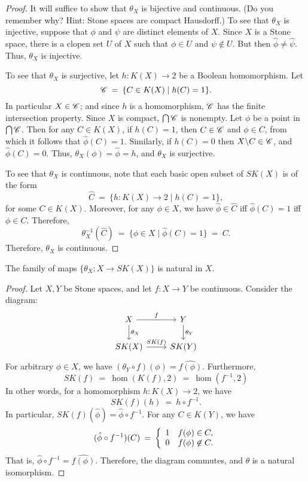 \begin{proof} It will suffice to show that $\theta _X$ is bijective
  and continuous.  (Do you remember why?  Hint: Stone spaces are
  compact Hausdorff.)  To see that $\theta _X$ is injective, suppose
  that $\phi$ and $\psi$ are distinct elements of $X$.  Since $X$ is a
  Stone space, there is a clopen set $U$ of $X$ such that $\phi\in U$
  and $\psi\not\in U$.  But then $\hat{\phi}\neq \hat{\psi}$.  Thus,
  $\theta _X$ is injective.

To see that $\theta _X$ is surjective, let $h:K(X)\to 2$ be a Boolean
homomorphism.  Let
\[ \mathscr C \: = \: \{ C\in K(X) \mid h(C) = 1 \} .\] In particular $X\in
\mathscr C$; and since $h$ is a homomorphism, $\mathscr C$ has the finite
intersection property.  Since $X$ is compact, $\bigcap \mathscr C$ is
nonempty.  Let $\phi$ be a point in $\bigcap\mathscr C$.  Then for any $C\in
K(X)$, if $h(C)=1$, then $C\in \mathscr C$ and $\phi \in C$, from which it
follows that $\hat{\phi}(C)=1$.  Similarly, if $h(C)=0$ then
$X\backslash C\in \mathscr C$, and $\hat{\phi }(C)=0$.  Thus, $\theta _X(\phi
)=\hat{\phi}=h$, and $\theta _X$ is surjective.

To see that $\theta _X$ is continuous, note that each basic open
subset of $SK(X)$ is of the form 
\[ \hat{C} \: = \: \{ h:K(X)\to 2 \mid h(C)=1 \} ,\] for some $C\in
K(X)$.  Moreover, for any $\phi \in X$, we have $\hat{\phi}\in
\hat{C}$ iff $\hat{\phi}(C)=1$ iff $\phi\in C$.  Therefore,
\[ \theta _X^{-1}(\hat{C}) \: = \: \{ \phi\in X \mid \hat{\phi}(C)=1
\} \: = \: C .\] Therefore, $\theta _X$ is continuous. \end{proof}

\begin{lemma} The family of maps $\{ \theta _X:X\to SK(X) \}$ is
  natural in $X$. \end{lemma}

\begin{proof} Let $X,Y$ be Stone spaces, and let $f:X\to Y$ be
  continuous.  Consider the diagram:
\[ \begin{tikzcd}
  X \arrow{r}{f} \arrow{d}{\theta _X} & Y \arrow{d}{\theta _Y} \\
  SK(X) \arrow{r}{SK(f)} & SK(Y)
\end{tikzcd} \] For arbitrary $\phi\in X$, we have $(\theta _Y\circ
f)(\phi )=\widehat{f(\phi )}$.  Furthermore,
\[ SK(f) \: = \: \hom (K(f),2) \: = \: \hom (f^{-1},2) \] In other
words, for a homomorphism $h:K(X)\to 2$, we have
\[ SK(f)(h) \: = \: h\circ f^{-1} .\] In particular, $SK(f)(\hat{\phi
})=\hat{\phi}\circ f^{-1}$.  For any $C\in K(Y)$, we have
\[ (\hat{\phi}\circ f^{-1})(C) \: = \: \left\{ \begin{array}{l l l}
    1 & f(\phi ) \in C ,\\
    0 & f(\phi ) \not\in C. \end{array} \right. \] That is,
$\hat{\phi}\circ f^{-1}=\widehat{f(\phi )}$.  Therefore, the diagram
commutes, and $\theta$ is a natural isomorphism.  \end{proof}

